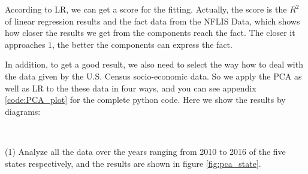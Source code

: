 \documentclass{mcmthesis}
\begin{document}
According to LR, we can get a score for the fitting. Actually, the score is the $R^{2}$ of linear regression results and the fact data from the NFLIS Data, which shows how closer the results we get from the components reach the fact. The closer it approaches $1$, the better the components can express the fact.

In addition, to get a good result, we also need to select the way how to deal with the data given by the U.S. Census socio-economic data. So we apply the PCA as well as LR to the these data in four ways, and you can see appendix \ref{code:PCA_plot} for the complete python code. Here we show the results by diagrams:

~\smallskip

(1) Analyze all the data over the years ranging from 2010 to 2016 of the five states respectively, and the results are shown in figure \ref{fig:pca_state}.
\end{document}
